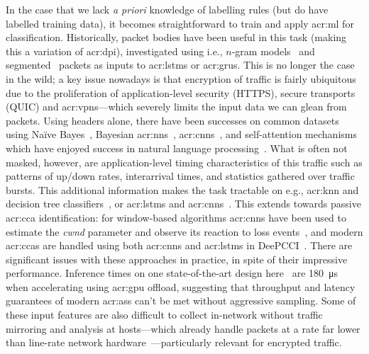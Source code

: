 In the case that we lack \emph{a priori} knowledge of labelling rules (but do have labelled training data), it becomes straightforward to train and apply \gls{acr:ml} for classification.
Historically, packet bodies have been useful in this task (making this a variation of \gls{acr:dpi}), investigated using i.e., $n$-gram models~\parencite{DBLP:journals/ton/YunW0Z16} and segmented~\parencite{DBLP:conf/iwqos/LiXNZX18} packets as inputs to \glspl{acr:lstm} or \glspl{acr:gru}.
This is no longer the case in the wild; a key issue nowadays is that encryption of traffic is fairly ubiquitous due to the proliferation of application-level security (HTTPS), secure transports (QUIC) and \glspl{acr:vpn}---which severely limits the input data we can glean from packets.
Using headers alone, there have been successes on common datasets using Na\"{i}ve Bayes~\parencite{DBLP:conf/sigmetrics/MooreZ05}, Bayesian \glspl{acr:nn}~\parencite{DBLP:journals/tnn/AuldMG07}, \glspl{acr:cnn}~\parencite{DBLP:journals/soco/LotfollahiSZS20}, and self-attention mechanisms~\parencite{DBLP:conf/sigcomm/Xie0JDSLSX20} which have enjoyed success in natural language processing~\parencite{DBLP:conf/nips/VaswaniSPUJGKP17}.
What is often not masked, however, are application-level timing characteristics of this traffic such as patterns of up/down rates, interarrival times, and statistics gathered over traffic bursts.
This additional information makes the task tractable on e.g., \gls{acr:knn} and decision tree classifiers~\parencite{DBLP:conf/icissp/Draper-GilLMG16}, or \glspl{acr:lstm} and \glspl{acr:cnn}~\parencite{DBLP:journals/tnsm/AcetoCMP19}.
This extends towards passive \gls{acr:cca} identification: for window-based algorithms \glspl{acr:cnn} have been used to estimate the \emph{cwnd} parameter and observe its reaction to loss events~\parencite{DBLP:conf/icccn/HagosEYK18}, and modern \glspl{acr:cca} are handled using both \glspl{acr:cnn} and \glspl{acr:lstm} in DeePCCI~\parencite{DBLP:conf/sigcomm/SanderRHW19}.
There are significant issues with these approaches in practice, in spite of their impressive performance.
Inference times on one state-of-the-art design here~\parencite{DBLP:conf/sigcomm/Xie0JDSLSX20}  are \qty{180}{\micro\second} when accelerating using \gls{acr:gpu} offload, suggesting that throughput and latency guarantees of modern \glspl{acr:as} can't be met without aggressive sampling.
Some of these input features are also difficult to collect in-network without traffic mirroring and analysis at hosts---which already handle packets at a rate far lower than line-rate network hardware~\parencite{DBLP:conf/sigcomm/GuptaHCFRW18}---particularly relevant for encrypted traffic.

